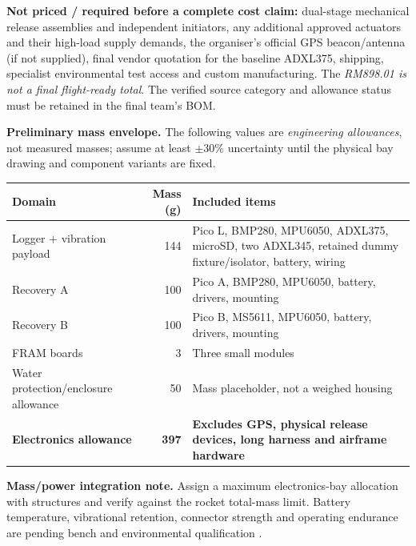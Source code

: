 \textbf{Not priced / required before a complete cost claim:} dual-stage mechanical release assemblies and independent initiators, any additional approved actuators and their high-load supply demands, the organiser's official GPS beacon/antenna (if not supplied), final vendor quotation for the baseline ADXL375, shipping, specialist environmental test access and custom manufacturing. The \emph{RM898.01 is not a final flight-ready total}. The verified source category and allowance status must be retained in the final team's BOM.

\textbf{Preliminary mass envelope.} The following values are \emph{engineering allowances}, not measured masses; assume at least $\pm30\%$ uncertainty until the physical bay drawing and component variants are fixed.
\par\medskip
\small
\begingroup
{}
\begin{tabularx}{\linewidth}{@{}L{45mm}r Y@{}}
\toprule{}\textbf{Domain}&\textbf{Mass (g)}&\textbf{Included items}\\\midrule
Logger + vibration payload & 144 & Pico L, BMP280, MPU6050, ADXL375, microSD, two ADXL345, retained dummy fixture/isolator, battery, wiring\\
Recovery A & 100 & Pico A, BMP280, MPU6050, battery, drivers, mounting\\
Recovery B & 100 & Pico B, MS5611, MPU6050, battery, drivers, mounting\\
FRAM boards & 3 & Three small modules\\
Water protection/enclosure allowance & 50 & Mass placeholder, not a weighed housing\\
\midrule
\textbf{Electronics allowance} & \textbf{397} & \textbf{Excludes GPS, physical release devices, long harness and airframe hardware}\\
\bottomrule
\end{tabularx}
\endgroup %
\normalsize

\textbf{Mass/power integration note.} Assign a maximum electronics-bay allocation with structures and verify against the rocket total-mass limit. Battery temperature, vibrational retention, connector strength and operating endurance are pending bench and environmental qualification \cite{rtc2027app03,rtc2027app08}.


